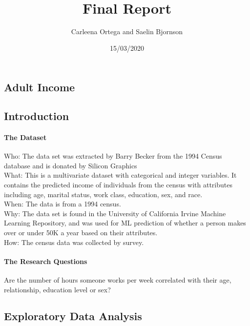 \documentclass[]{article}
\title{Final Report}
\author{Carleena Ortega and Saelin Bjornson}
\date{15/03/2020}
\let\oldparagraph\paragraph
\renewcommand{\paragraph}[1]{\oldparagraph{#1}\mbox{}}
\begin{document}
\maketitle

{
\setcounter{tocdepth}{4}
\tableofcontents
}
\hypertarget{adult-income}{%
\subsection{Adult Income}\label{adult-income}}

\hypertarget{introduction}{%
\subsection{Introduction}\label{introduction}}

\hypertarget{the-dataset}{%
\paragraph{The Dataset}\label{the-dataset}}

Who: The data set was extracted by Barry Becker from the 1994 Census
database and is donated by Silicon Graphics\\
What: This is a multivariate dataset with categorical and integer
variables. It contains the predicted income of individuals from the
census with attributes including age, marital status, work class,
education, sex, and race.\\
When: The data is from a 1994 census.\\
Why: The data set is found in the University of California Irvine
Machine Learning Repository, and was used for ML prediction of whether a
person makes over or under 50K a year based on their attributes.\\
How: The census data was collected by survey.

\hypertarget{the-research-questions}{%
\paragraph{The Research Questions}\label{the-research-questions}}

Are the number of hours someone works per week correlated with their
age, relationship, education level or sex?

\hypertarget{exploratory-data-analysis}{%
\subsection{Exploratory Data Analysis}\label{exploratory-data-analysis}}
\end{document}
